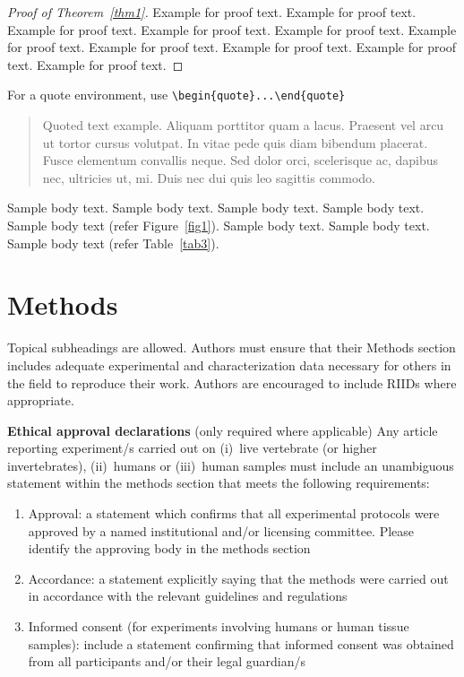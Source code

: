 \documentclass[pdflatex,sn-mathphys-num]{sn-jnl}%
\theoremstyle{thmstyleone}%
\theoremstyle{thmstyletwo}%
\theoremstyle{thmstylethree}%
\begin{document}
\begin{proof}[Proof of Theorem~{\upshape\ref{thm1}}]
Example for proof text. Example for proof text. Example for proof text. Example for proof text. Example for proof text. Example for proof text. Example for proof text. Example for proof text. Example for proof text. Example for proof text. 
\end{proof}

\noindent
For a quote environment, use \verb+\begin{quote}...\end{quote}+
\begin{quote}
Quoted text example. Aliquam porttitor quam a lacus. Praesent vel arcu ut tortor cursus volutpat. In vitae pede quis diam bibendum placerat. Fusce elementum
convallis neque. Sed dolor orci, scelerisque ac, dapibus nec, ultricies ut, mi. Duis nec dui quis leo sagittis commodo.
\end{quote}

Sample body text. Sample body text. Sample body text. Sample body text. Sample body text (refer Figure~\ref{fig1}). Sample body text. Sample body text. Sample body text (refer Table~\ref{tab3}). 

\section{Methods}\label{sec11}

Topical subheadings are allowed. Authors must ensure that their Methods section includes adequate experimental and characterization data necessary for others in the field to reproduce their work. Authors are encouraged to include RIIDs where appropriate. 

\textbf{Ethical approval declarations} (only required where applicable) Any article reporting experiment/s carried out on (i)~live vertebrate (or higher invertebrates), (ii)~humans or (iii)~human samples must include an unambiguous statement within the methods section that meets the following requirements: 

\begin{enumerate}[1.]
\item Approval: a statement which confirms that all experimental protocols were approved by a named institutional and/or licensing committee. Please identify the approving body in the methods section

\item Accordance: a statement explicitly saying that the methods were carried out in accordance with the relevant guidelines and regulations

\item Informed consent (for experiments involving humans or human tissue samples): include a statement confirming that informed consent was obtained from all participants and/or their legal guardian/s
\end{enumerate}
\end{document}
